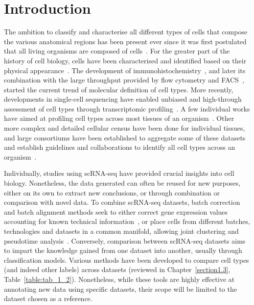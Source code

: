 \section{Introduction}
\label{section3.1}
The ambition to classify and characterise all different types of cells that compose the various anatomical regions has been present ever since it was first postulated that all living organisms are composed of cells~\citep{schwann_microscopical_1847}. For the greater part of the history of cell biology, cells have been characterised and identified based on their physical appearance~\citep{mazzarello_unifying_1999}. The development of immunohistochemistry~\citep{coons_immunological_1941}, and later its combination with the large throughput provided by flow cytometry and FACS~\citep{hulett_cell_1969,bonner_fluorescence_1972}, started the current trend of molecular definition of cell types. More recently, developments in single-cell sequencing have enabled unbiased and high-through assessment of cell types through transcriptomic profiling~\citep{svensson_exponential_2018}. A few individual works have aimed at profiling cell types across most tissues of an organism~\citep{fincher_cell_2018,plass_cell_2018,han_mapping_2018,noauthor_single-cell_2018}. Other more complex and detailed cellular census have been done for individual tissues, and large consortiums have been established to aggregate some of these datasets and establish guidelines and collaborations to identify all cell types across an organism~\citep{regev_human_2017}.

Individually, studies using scRNA-seq have provided crucial insights into cell biology. Nonetheless, the data generated can often be reused for new purposes, either on its own to extract new conclusions, or through combination or comparison with novel data. To combine scRNA-seq datasets, batch correction and batch alignment methods seek to either correct gene expression values accounting for known technical information~\citep{ritchie_limma_2015,johnson_adjusting_2007,buettner_f-sclvm:_2017,haghverdi_batch_2018,buttner_test_2019}, or place cells from different batches, technologies and datasets in a common manifold, allowing joint clustering and pseudotime analysis~\citep{butler_integrating_2018,polanski_bbknn:_2019,hie_efficient_2019,korsunsky_fast_2018,stuart_comprehensive_2019}. Conversely, comparison between scRNA-seq datasets aims to impart the knowledge gained from one dataset into another, usually through classification models. Various methods have been developed to compare cell types (and indeed other labels) across datasets (reviewed in Chapter~\ref{section1.3}, Table~\ref{table:tab_1_2}). Nonetheless, while these tools are highly effective at annotating new data using specific datasets, their scope will be limited to the dataset chosen as a reference.

